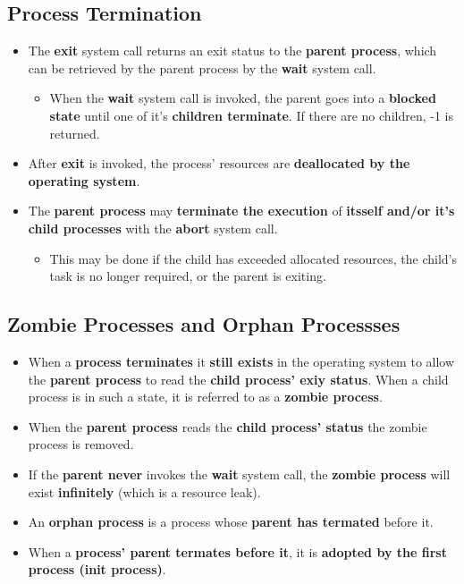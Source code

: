 \documentclass{article}
\begin{document}
    \subsection*{Process Termination}
    \begin{itemize}
        \item The \textbf{exit} system call returns an exit status to the \textbf{parent process}, which can be retrieved by the parent process by the \textbf{wait} system call.
        \begin{itemize}
            \item When the \textbf{wait} system call is invoked, the parent goes into a \textbf{blocked state} until one of it's \textbf{children terminate}. If there are no children, -1 is returned.
        \end{itemize}
        \item After \textbf{exit} is invoked, the process' resources are \textbf{deallocated by the operating system}.
        \item The \textbf{parent process} may \textbf{terminate the execution} of \textbf{itsself and/or it's child processes} with the \textbf{abort} system call.
        \begin{itemize}
            \item This may be done if the child has exceeded allocated resources, the child's task is no longer required, or the parent is exiting.
        \end{itemize}
    \end{itemize}

    \subsection*{Zombie Processes and Orphan Processses}
    \begin{itemize}
        \item When a \textbf{process terminates} it \textbf{still exists} in the operating system to allow the \textbf{parent process} to read the \textbf{child process' exiy status}. When a child process is in such a state, it is referred to as a \textbf{zombie process}.
        \item When the \textbf{parent process} reads the \textbf{child process' status} the zombie process is removed.
        \item If the \textbf{parent never} invokes the \textbf{wait} system call, the \textbf{zombie process} will exist \textbf{infinitely} (which is a resource leak).
        \item An \textbf{orphan process} is a process whose \textbf{parent has termated} before it.
        \item When a \textbf{process' parent termates before it}, it is \textbf{adopted by the first process (init process)}.
    \end{itemize}
\end{document}

